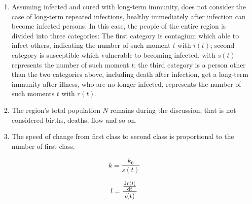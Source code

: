 \begin{enumerate}
  \item Assuming infected and cured with long-term immunity,
   does not consider the case of long-term repeated infections,
   healthy immediately after infection can become infected
   persons. In this case, the people of the entire region is
   divided into three categories: The first category is
   contagium which able to infect others, indicating
   the number of such moment $ t $ with $ i(t) $; second
   category is susceptible which vulnerable to becoming infected, 
   with $ s(t) $ represents the number of such moment $ t $;
   the third category is a person other than the two
   categories above, including death after infection,
   get a long-term immunity after illness, who are
   no longer infected, represents the number of such
   moments $ t $ with $ r(t) $.
  \item The region's total population $N$ remains
   during the discussion, that is not considered births, deaths,
   flow and so on.
  \item The speed of change from first class to second class is
   proportional to the number of first class.
\end{enumerate}
\begin{equation}
k=\frac{k_0}{s(t)}
\label{equ:4}
\end{equation}

\begin{equation}
l=\frac{\frac{{\mathrm{d}}r(t)}{{\mathrm{d}}t}}{i(t)}
\label{equ:5}
\end{equation}

